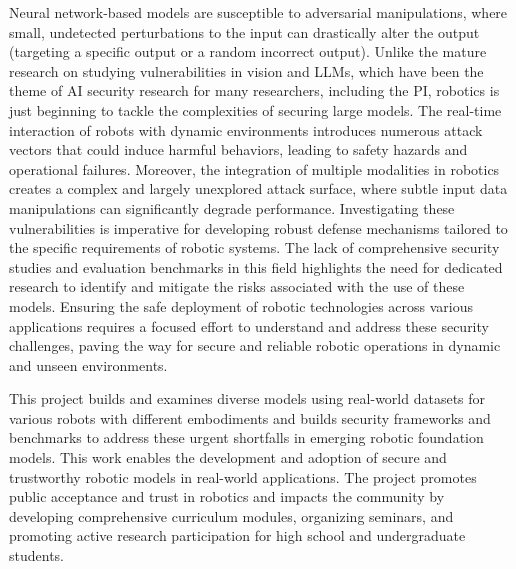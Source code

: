 Neural network-based models are susceptible to adversarial manipulations, where small, undetected perturbations to the input can drastically alter the output (\eg targeting a specific output or a random incorrect output). Unlike the mature research on studying vulnerabilities in vision and LLMs, which have been the theme of AI security research for many researchers, including the PI, robotics is just beginning to tackle the complexities of securing large models. The real-time interaction of robots with dynamic environments introduces numerous attack vectors that could induce harmful behaviors, leading to safety hazards and operational failures. 
Moreover, the integration of multiple modalities in robotics creates a complex and largely unexplored attack surface, where subtle input data manipulations can significantly degrade performance.
Investigating these vulnerabilities is imperative for developing robust defense mechanisms tailored to the specific requirements of robotic systems. 
The lack of comprehensive security studies and evaluation benchmarks in this field highlights the need for dedicated research to identify and mitigate the risks associated with the use of these models. Ensuring the safe deployment of robotic technologies across various applications requires a focused effort to understand and address these security challenges, paving the way for secure and reliable robotic operations in dynamic and unseen environments.

This project builds and examines diverse models using real-world \xot datasets for various robots with different embodiments and builds security frameworks and benchmarks to address these urgent shortfalls in emerging robotic foundation models. This work enables the development and adoption of secure and trustworthy robotic models in real-world applications.
The project promotes public acceptance and trust in robotics and impacts the community by developing comprehensive curriculum modules, organizing seminars, and promoting active research participation for high school and undergraduate students.







